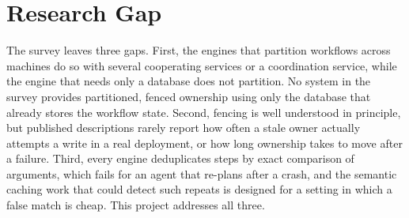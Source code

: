 \section{Research Gap}

The survey leaves three gaps. First, the engines that partition
workflows across machines do so with several cooperating services or a
coordination service, while the engine that needs only a database does not
partition. No system in the survey provides partitioned, fenced ownership
using only the database that already stores the workflow state. Second,
fencing is well understood in principle, but published descriptions rarely
report how often a stale owner actually attempts a write in a real deployment,
or how long ownership takes to move after a failure. Third, every engine
deduplicates steps by exact comparison of arguments, which fails for an agent that
re-plans after a crash, and the semantic
caching work that could detect such repeats is designed for a setting in which
a false match is cheap. This project addresses all three.
